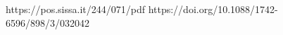 \documentclass[../main.tex]{subfiles}
\begin{document}
    https://pos.sissa.it/244/071/pdf
    https://doi.org/10.1088/1742-6596/898/3/032042
\end{document}

